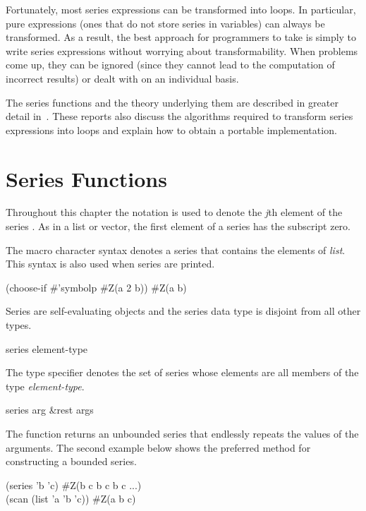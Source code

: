 Fortunately, most series expressions can be transformed into loops.  In
particular, pure expressions (ones that do not store series in variables)
can always be transformed.  As a result, the best approach for programmers
to take is simply to write series expressions without worrying about
transformability.  When problems come up, they can be ignored (since they
cannot lead to the computation of incorrect results) or dealt with on an
individual basis.

\beforenoterule
\begin{implementation}
The series functions and the theory
underlying them are described in greater detail
in~\cite{WATERS-SERIES-DESIGN,WATERS-SERIES-IMPLEMENTATION}.
These reports also discuss the algorithms required to transform series
expressions into loops and explain how to obtain a portable implementation.
\end{implementation}
\afternoterule

\section{Series Functions}
\label{SERIES-F-SECTION}

Throughout this chapter the notation  is used to
denote the {\it j\/}th element of the series .  As in a list or
vector, the first element of a series has the subscript zero.

The \cd{\#} macro character syntax  denotes a series that contains
the elements of {\it list}.  This syntax is also used when series are printed.
\begin{lisp}
(choose-if \#'symbolp \#Z(a 2 b)) {\EV} \#Z(a b)
\end{lisp}
Series are self-evaluating objects and the series data type is disjoint
from all other types.


\begin{defun}
series element-type

The type specifier 
denotes the set of series whose elements are all
members of the type {\it element-type}.
\end{defun}


\begin{defun}[Function]
series arg &rest args

The function  returns an unbounded series that endlessly repeats the
values of the arguments.  The second example below shows the preferred
method for constructing a bounded series.
\begin{lisp}
(series 'b 'c) {\EV} \#Z(b c b c b c ...) \\
(scan (list 'a 'b 'c)) {\EV} \#Z(a b c)
\end{lisp}
\end{defun}

